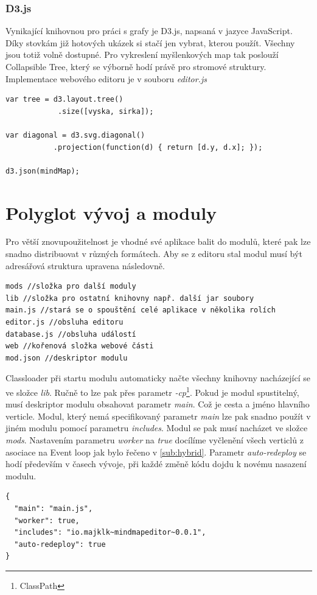 \subsubsection{D3.js}

Vynikající knihovnou pro práci s grafy je D3.js, napsaná v jazyce JavaScript. Díky stovkám již hotových ukázek si stačí jen vybrat, kterou použít. Všechny jsou totiž volně dostupné. Pro vykreslení myšlenkových map tak poslouží Collapsible Tree\cite{d3js}, který se výborně hodí právě pro stromové struktury. Implementace webového editoru je v souboru \emph{editor.js}

\begin{lstlisting}[caption=D3.js nicializace dat]
var tree = d3.layout.tree()
		    .size([vyska, sirka]);

var diagonal = d3.svg.diagonal()
		   .projection(function(d) { return [d.y, d.x]; });
		   
d3.json(mindMap);
\end{lstlisting}


\section{Polyglot vývoj a moduly}\label{sec:praktickyModuly}

Pro větší znovupoužitelnost je vhodné své aplikace balit do modulů, které pak lze snadno distribuovat v různých formátech. Aby se z editoru stal modul musí být adresářová struktura upravena následovně.

\begin{lstlisting}
mods //složka pro další moduly
lib //složka pro ostatní knihovny např. další jar soubory
main.js //stará se o spouštění celé aplikace v několika rolích
editor.js //obsluha editoru
database.js //obsluha událostí 
web //kořenová složka webové části
mod.json //deskriptor modulu
\end{lstlisting}

Classloader při startu modulu automaticky načte všechny knihovny nacházející se ve složce \emph{lib}. Ručně to lze pak přes parametr \emph{-cp}\footnote{ClassPath}. Pokud je modul spustitelný, musí deskriptor modulu obsahovat parametr \emph{main}. Což je cesta a jméno hlavního verticle. Modul, který nemá specifikovaný parametr \emph{main} lze pak snadno použít v jiném modulu pomocí parametru \emph{includes}. Modul se pak musí nacházet ve složce \emph{mods}. Nastavením parametru \emph{worker} na \emph{true} docílíme vyčlenění všech verticlů z asociace na Event loop jak bylo řečeno v \ref{sub:hybrid}. Parametr \emph{auto-redeploy} se hodí především v časech vývoje, při každé změně kódu dojdu k novému nasazení modulu. 
\begin{lstlisting}
{
  "main": "main.js",
  "worker": true,
  "includes": "io.majklk~mindmapeditor~0.0.1",
  "auto-redeploy": true
}
\end{lstlisting}

